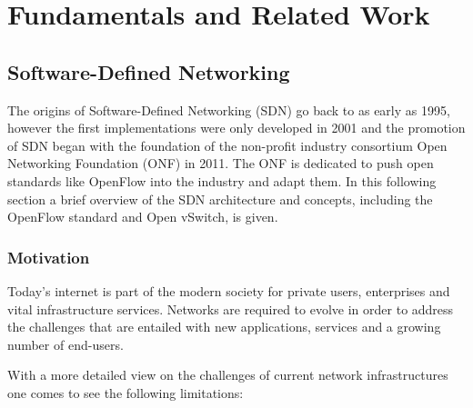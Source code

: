 \chapter{Fundamentals and Related Work}

\section{Software-Defined Networking}

The origins of Software-Defined Networking (SDN) go back to as early as 1995, however the first implementations were only developed in 2001 and the promotion of SDN began with the foundation of the non-profit industry consortium Open Networking Foundation (ONF) in 2011. \cite{roadtosdn}
The ONF is dedicated to push open standards like OpenFlow into the industry and adapt them.
In this following section a brief overview of the SDN architecture and concepts, including the OpenFlow standard and Open vSwitch, is given.

\subsection{Motivation}

Today's internet is part of the modern society for private users, enterprises and vital infrastructure services. Networks are required to evolve in order to address the challenges that are entailed with new applications, services and a growing number of end-users.

With a more detailed view on the challenges of current network infrastructures one comes to see the following limitations: \cite{onfnewnorm}

